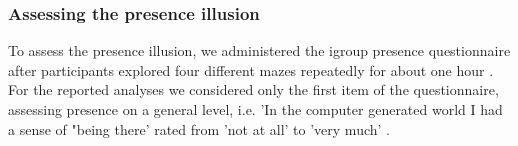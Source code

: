 \subsubsection{Assessing the presence illusion} To assess the presence illusion, we administered the igroup presence questionnaire after participants explored four different mazes repeatedly for about one hour \cite{Schubert2003}. For the reported analyses we considered only the first item of the questionnaire, assessing presence on a general level, i.e. 'In the computer generated world I had a sense of "being there' rated from 'not at all' to 'very much' \cite{Schubert2003, Slater1993}.